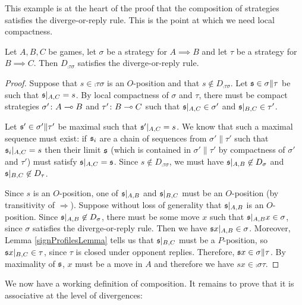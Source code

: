 \documentclass{article}
\begin{document}
This example is at the heart of the proof that the composition of strategies satisfies the diverge-or-reply rule.  This is the point at which we need local compactness.

\begin{proposition}
  Let $A,B,C$ be games, let $\sigma$ be a strategy for $A\implies B$ and let $\tau$ be a strategy for $B\implies C$.  Then $D_{\comp\tau\sigma}$ satisfies the diverge-or-reply rule.

  \begin{proof}
    Suppose that $s\in\comp\tau\sigma$ is an $O$-position and that $s\not\in D_{\comp\tau\sigma}$.  Let $\mathfrak s\in\sigma\|\tau$ be such that $\mathfrak s\vert_{A,C}=s$.  By local compactness of $\sigma$ and $\tau$, there must be compact strategies $\sigma'\colon A\multimap B$ and $\tau'\colon B\multimap C$ such that $\mathfrak s\vert_{A,C}\in\sigma'$ and $\mathfrak s\vert_{B,C}\in\tau'$.  
    
    Let $\mathfrak s'\in\sigma'\|\tau'$ be maximal such that $\mathfrak s'\vert_{A,C}=s$.  We know that such a maximal sequence must exist: if $\mathfrak s_i$ are a chain of sequences from $\sigma'\|\tau'$ such that $\mathfrak s_i\vert_{A,C}=s$ then their limit $\mathfrak s$ (which is contained in $\sigma'\|\tau'$ by compactness of $\sigma'$ and $\tau'$) must satisfy $\mathfrak s\vert_{A,C}=\mathfrak s$.  Since $s\not\in D_{\comp\tau\sigma}$, we must have $\mathfrak s\vert_{A,B}\not\in D_\sigma$ and $\mathfrak s\vert_{B,C}\not\in D_\tau$.  
    
    Since $s$ is an $O$-position, one of $\mathfrak s\vert_{A,B}$ and $\mathfrak s\vert_{B,C}$ must be an $O$-position (by transitivity of $\Rightarrow$).  Suppose without loss of generality that $\mathfrak s\vert_{A,B}$ is an $O$-position.  Since $\mathfrak s\vert_{A,B}\not\in D_\sigma$, there must be some move $x$ such that $\mathfrak s\vert_{A,B}x\in\sigma$, since $\sigma$ satisfies the diverge-or-reply rule.  Then we have $\mathfrak s x\vert_{A,B}\in\sigma$.  Moreover, Lemma \ref{signProfilesLemma} tells us that $\mathfrak s\vert_{B,C}$ must be a $P$-position, so $\mathfrak s x\vert_{B,C}\in\tau$, since $\tau$ is closed under opponent replies.  Therefore, $\mathfrak s x\in\sigma\|\tau$.  By maximality of $\mathfrak s$, $x$ must be a move in $A$ and therefore we have $sx\in\comp\sigma\tau$.
  \end{proof}
\end{proposition}

We now have a working definition of composition.  It remains to prove that it is associative at the level of divergences:
\end{document}

